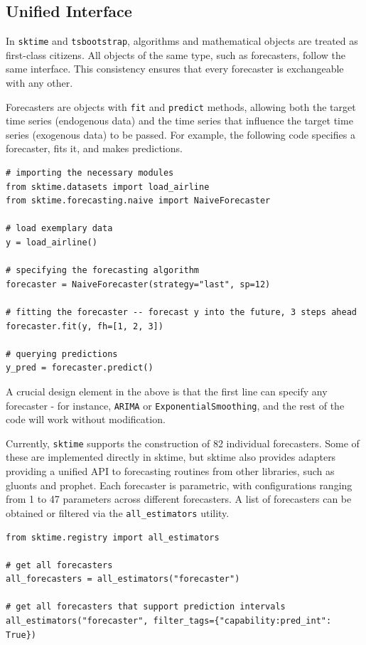 \subsection{Unified Interface}
In \texttt{sktime} and \texttt{tsbootstrap}, algorithms and mathematical objects are treated as first-class citizens. All objects of the same type, such as forecasters, follow the same interface. This consistency ensures that every forecaster is exchangeable with any other.

Forecasters are objects with \texttt{fit} and \texttt{predict} methods, allowing both the target time series (endogenous data) and the time series that influence the target time series (exogenous data) to be passed. For example, the following code specifies a forecaster, fits it, and makes predictions.

\begin{verbatim}
# importing the necessary modules
from sktime.datasets import load_airline
from sktime.forecasting.naive import NaiveForecaster

# load exemplary data
y = load_airline()

# specifying the forecasting algorithm
forecaster = NaiveForecaster(strategy="last", sp=12)

# fitting the forecaster -- forecast y into the future, 3 steps ahead
forecaster.fit(y, fh=[1, 2, 3])

# querying predictions
y_pred = forecaster.predict()
\end{verbatim}

A crucial design element in the above is that the first line can specify any forecaster - for instance, \texttt{ARIMA} or \texttt{ExponentialSmoothing},
and the rest of the code will work without modification. 

Currently, \texttt{sktime} supports the construction of 82 individual forecasters.
Some of these are implemented directly in sktime, but sktime also provides adapters providing a unified API to forecasting routines from other libraries, such as gluonts and prophet.
Each forecaster is parametric, with configurations ranging from 1 to 47 parameters across different forecasters. A list of forecasters can be obtained or filtered via the \texttt{all\_estimators} utility.
\begin{verbatim}
from sktime.registry import all_estimators

# get all forecasters
all_forecasters = all_estimators("forecaster")

# get all forecasters that support prediction intervals
all_estimators("forecaster", filter_tags={"capability:pred_int": True})

\end{verbatim}

